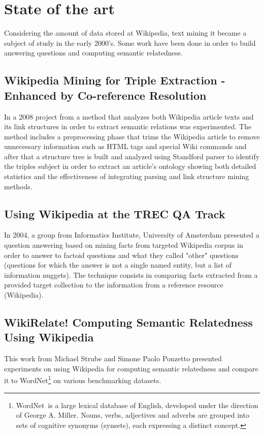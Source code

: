\documentclass{llncs}
\begin{document}
\section{State of the art}

Considering the amount of data stored at Wikipedia, text mining it became a subject of study in the early 2000's. Some work have been done in order to build answering questions and computing semantic relatedness.

\subsection{Wikipedia Mining for Triple Extraction - Enhanced by Co-reference Resolution}

In a 2008 project from  a method that analyzes both Wikipedia article texts and its link structures in order to extract semantic relations was experimented. The method includes a preprocessing phase that trims the Wikipedia article to remove unnecessary information such as HTML tags and special Wiki commands\cite{nakayama} and after that a structure tree is built and analyzed using Standford parser to identify the triples subject in order to extract an article's ontology showing both detailed statistics and the effectiveness of integrating parsing and link structure mining methods.

\subsection{Using Wikipedia at the TREC QA Track}

In 2004, a group from Informatics Institute, University of Amsterdam presented a question answering based on mining facts from targeted Wikipedia corpus in order to answer to factoid questions and what they called "other" questions (questions for which the answer is not a single named entity, but a list of information nuggets). The technique consists in comparing facts extracted from a provided target collection to the information from a reference resource (Wikipedia)\cite{ahn}.

\subsection{WikiRelate! Computing Semantic Relatedness Using Wikipedia}

This work from Michael Strube and Simone Paolo Ponzetto presented experiments on using Wikipedia for computing semantic relatedness and compare it to WordNet\footnote{WordNet\textregistered\ is a large lexical database of English, developed under the direction of George A. Miller. Nouns, verbs, adjectives and adverbs are grouped into sets of cognitive synonyms (synsets), each expressing a distinct concept.} on various benchmarking datasets\cite{strube}.
\end{document}
